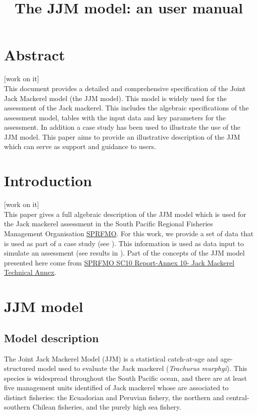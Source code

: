 \documentclass{article}
\title{The JJM model: an user manual}
\date{\parbox{\linewidth}{\centering%
  \skip
  Mirian GERONIMO \hspace*{3cm} Criscely LUJAN \endgraf\medskip
  Instituto del Mar del Perú (IMARPE)}
  }
\begin{document}
\maketitle

\tableofcontents
\newpage

\section*{Abstract} 
[work on it] \\
This document provides a detailed and comprehensive specification of the Joint Jack Mackerel model (the JJM model). This model is widely used for the assessment of the Jack mackerel. This includes the algebraic specifications of the assessment model, tables with the input data and key parameters for the assessment. In addition a case study has been used to illustrate the use of the JJM model. This paper aims to provide an illustrative description of the JJM which can serve as support and guidance to users.

\section{Introduction} 

[work on it] \\
This paper gives a full algebraic description of the JJM model which is used for the Jack mackerel assessment in the South Pacific Regional Fisheries Management Organisation \href{https://www.sprfmo.int/}{SPRFMO}. For this work, we provide a set of data that is used as part of a case study (see ). This information is used as data input to simulate an assessment (see results in ). Part of the concepts of the JJM model presented here come from \href{https://www.sprfmo.int/assets/Meetings/SC/10th-SC-2022/Report-and-Annexes/Annex-8-JM-Technical-Advice-CV_2.pdf}{SPRFMO SC10 Report-Annex 10- Jack Mackerel Technical Annex}.

\section{JJM model}

\subsection{Model description}

The Joint Jack Mackerel Model (JJM) is a statistical catch-at-age and age-structured model used to evaluate the Jack mackerel (\textit{Trachurus murphyi}). This species is widespread throughout the South Pacific ocean, and there are at least five management units identified of Jack mackerel whose are associated to distinct fisheries: the Ecuadorian and Peruvian fishery, the northern and central-southern Chilean fisheries, and the purely high sea fishery. 
\end{document}

